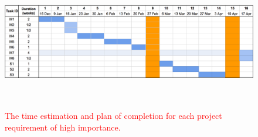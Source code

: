 \documentclass{mprop}
\theoremstyle{definition}
\begin{document}
\begin{figure}
\centering
\caption{\textcolor{red}{The time estimation and plan of completion for each project requirement of high importance.}}
\label{fig:estimation}
\includegraphics[width=16cm, height=6cm]{images/estimation.png}
\end{figure}

\clearpage


\end{document}
